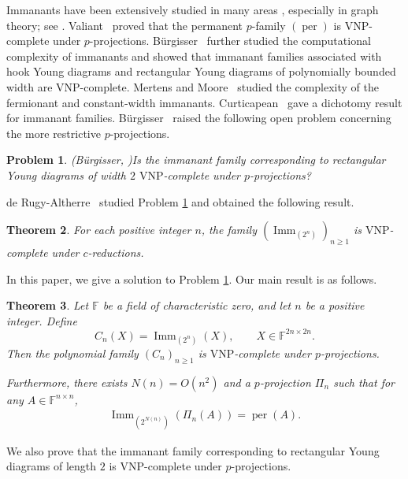\documentclass[11pt,a4paper]{article}
\newtheorem{theorem}{Theorem}[section]
\newtheorem{problem}[theorem]{Problem}
\begin{document}
Immanants have been extensively studied in many areas \cite{gou1,gou2,hai,lam,li,ste}, especially in graph theory; see \cite{chan,don1,don2,mer2,mer3,mer4,wu1,yu}. Valiant~\cite{val} proved that the permanent $p$-family $(\operatorname{per})$ is $\mathrm{VNP}$-complete under $p$-projections. Bürgisser~\cite{Bur2} further studied the computational complexity of immanants and showed that immanant families associated with hook Young diagrams and rectangular Young diagrams of polynomially bounded width are $\mathrm{VNP}$-complete. Mertens and Moore~\cite{mermoore} studied the complexity of the fermionant and constant‐width immanants. Curticapean~\cite{curticapean} gave a dichotomy result for immanant families. Bürgisser~\cite{Bur2} raised the following open problem concerning the more restrictive $p$-projections.

\begin{problem}(B\"urgisser, \cite{Bur2})\label{prob1}
Is the immanant family corresponding to rectangular Young diagrams of width $2$ $\mathrm{VNP}$-complete under $p$-projections?
\end{problem}

de Rugy-Altherre~\cite{rug} studied Problem \ref{prob1} and obtained the following result.

\begin{theorem}
For each positive integer $n$, the family $(\operatorname{Imm}_{(2^n)})_{n\geq 1}$ is $\mathrm{VNP}$-complete under $c$-reductions.
\end{theorem}

In this paper, we give a solution to Problem \ref{prob1}. Our main result is as follows.

\begin{theorem}\label{thm1}
Let $\mathbb{F}$ be a field of characteristic zero, and let $n$ be a positive integer. Define
\[
  C_n(X)=\operatorname{Imm}_{(2^n)}(X),
  \qquad X\in\mathbb{F}^{2n\times 2n}.
\]
Then the polynomial family $(C_n)_{n\geq 1}$ is $\mathrm{VNP}$-complete under $p$-projections.

Furthermore, there exists $N(n)=O(n^2)$ and a $p$-projection $\Pi_n$ such that for any $A\in\mathbb{F}^{n\times n}$,
\begin{eqnarray*}
  \operatorname{Imm}_{(2^{N(n)})}(\Pi_n(A))=\operatorname{per}(A).
\end{eqnarray*}
\end{theorem}

We also prove that the immanant family corresponding to rectangular Young diagrams of length $2$ is $\mathrm{VNP}$-complete under $p$-projections.
\end{document}
